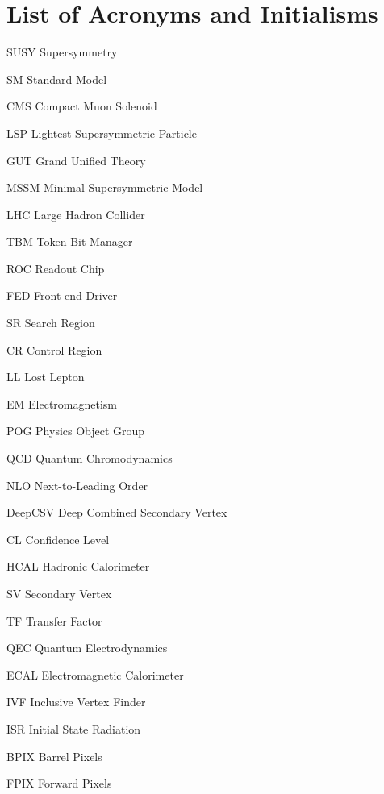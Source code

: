 \chapter{List of Acronyms and Initialisms}

\begin{abbrv}
\item[SUSY]     	Supersymmetry
\item[SM]       	Standard Model
\item[CMS]		Compact Muon Solenoid
\item[LSP]		Lightest Supersymmetric Particle
\item[GUT]		Grand Unified Theory
\item[MSSM]		Minimal Supersymmetric Model
\item[LHC]		Large Hadron Collider
\item[TBM]		Token Bit Manager
\item[ROC]		Readout Chip
\item[FED]		Front-end Driver
\item[SR]		Search Region
\item[CR]		Control Region
\item[LL]		Lost Lepton
\item[EM]		Electromagnetism
\item[POG]		Physics Object Group
\item[QCD]		Quantum Chromodynamics
\item[NLO]		Next-to-Leading Order
\item[DeepCSV]		Deep Combined Secondary Vertex
\item[CL]		Confidence Level
\item[HCAL] 		Hadronic Calorimeter
\item[SV]		Secondary Vertex
\item[TF]		Transfer Factor
\item[QEC]		Quantum Electrodynamics
\item[ECAL]		Electromagnetic Calorimeter
\item[IVF]		Inclusive Vertex Finder
\item[ISR]		Initial State Radiation
\item[BPIX]		Barrel Pixels
\item[FPIX]		Forward Pixels
\end{abbrv}


